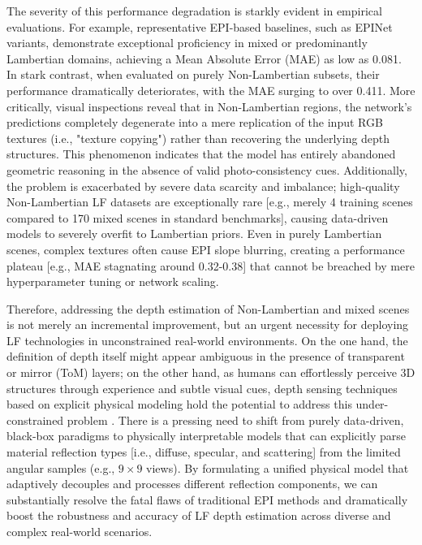 The severity of this performance degradation is starkly evident in empirical evaluations. For example, representative EPI-based baselines, such as EPINet variants, demonstrate exceptional proficiency in mixed or predominantly Lambertian domains, achieving a Mean Absolute Error (MAE) as low as 0.081. In stark contrast, when evaluated on purely Non-Lambertian subsets, their performance dramatically deteriorates, with the MAE surging to over 0.411. More critically, visual inspections reveal that in Non-Lambertian regions, the network's predictions completely degenerate into a mere replication of the input RGB textures (i.e., "texture copying") rather than recovering the underlying depth structures. This phenomenon indicates that the model has entirely abandoned geometric reasoning in the absence of valid photo-consistency cues. Additionally, the problem is exacerbated by severe data scarcity and imbalance; high-quality Non-Lambertian LF datasets are exceptionally rare  [e.g., merely 4 training scenes compared to 170 mixed scenes in standard benchmarks], causing data-driven models to severely overfit to Lambertian priors. Even in purely Lambertian scenes, complex textures often cause EPI slope blurring, creating a performance plateau  [e.g., MAE stagnating around 0.32-0.38] that cannot be breached by mere hyperparameter tuning or network scaling.

Therefore, addressing the depth estimation of Non-Lambertian and mixed scenes is not merely an incremental improvement, but an urgent necessity for deploying LF technologies in unconstrained real-world environments. On the one hand, the definition of depth itself might appear ambiguous in the presence of transparent or mirror (ToM) layers; on the other hand, as humans can effortlessly perceive 3D structures through experience and subtle visual cues, depth sensing techniques based on explicit physical modeling hold the potential to address this under-constrained problem \cite{transparentormirrorsurfaces}. There is a pressing need to shift from purely data-driven, black-box paradigms to physically interpretable models that can explicitly parse material reflection types  [i.e., diffuse, specular, and scattering] from the limited angular samples (e.g., $9 \times 9$ views). By formulating a unified physical model that adaptively decouples and processes different reflection components, we can substantially resolve the fatal flaws of traditional EPI methods and dramatically boost the robustness and accuracy of LF depth estimation across diverse and complex real-world scenarios.

